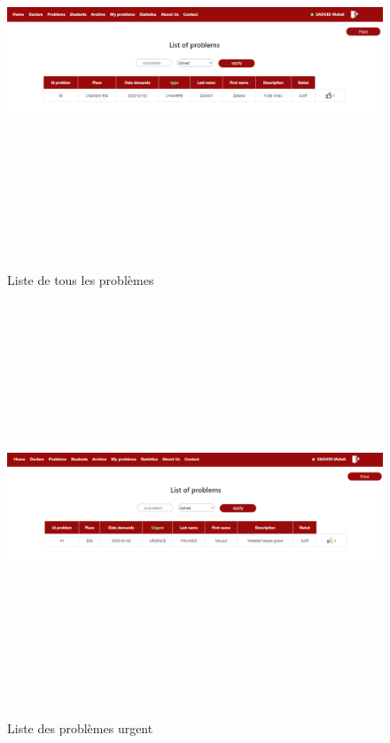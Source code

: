 \documentclass[11.5pt]{report}
\begin{document}
\newpage
\begin{figure}[h]
	
	\begin{center}
		\includegraphics[width=500pt,height=350pt]{problems-admin.png} 
		\caption{Liste de tous les problèmes }
	\end{center}
	
\end{figure}
\newpage
\begin{figure}[h]
	
	\begin{center}
		\includegraphics[width=500pt,height=350pt]{urgence.png} 
		\caption{Liste des problèmes urgent}
	\end{center}
	
\end{figure}
\end{document}
